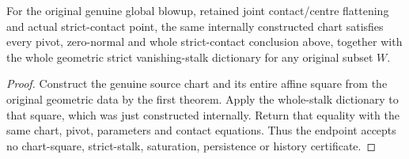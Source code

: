\begin{theorem}
\label{hir:actual-strict-contact-whole-chart-endpoint}
\leanok
For the original genuine global blowup, retained joint contact/centre flattening and actual strict-contact point, the same internally constructed chart satisfies every pivot, zero-normal and whole strict-contact conclusion above, together with the whole geometric strict vanishing-stalk dictionary for any original subset $W$.
\end{theorem}
\begin{proof}
Construct the genuine source chart and its entire affine square from the original geometric data by the first theorem. Apply the whole-stalk dictionary to that square, which was just constructed internally. Return that equality with the same chart, pivot, parameters and contact equations. Thus the endpoint accepts no chart-square, strict-stalk, saturation, persistence or history certificate.
\end{proof}
